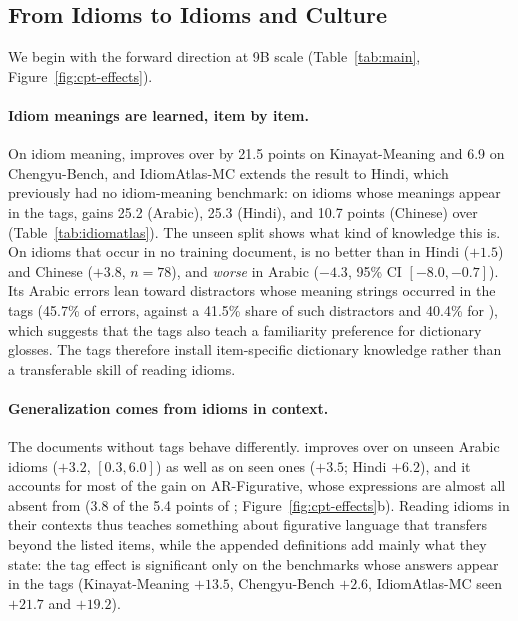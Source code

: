 \subsection{From Idioms to Idioms and Culture}
\label{sec:results-idiom}



We begin with the forward direction at 9B scale (Table~\ref{tab:main}, Figure~\ref{fig:cpt-effects}).

\paragraph{Idiom meanings are learned, item by item.}
On idiom meaning, \idiomcpt{} improves over \random{} by 21.5 points on Kinayat-Meaning and 6.9 on Chengyu-Bench, and IdiomAtlas-MC extends the result to Hindi, which previously had no idiom-meaning benchmark: on idioms whose meanings appear in the tags, \idiomcpt{} gains 25.2 (Arabic), 25.3 (Hindi), and 10.7 points (Chinese) over \random{} (Table~\ref{tab:idiomatlas}). The unseen split shows what kind of knowledge this is. On idioms that occur in no training document, \idiomcpt{} is no better than \random{} in Hindi ($+1.5$) and Chinese ($+3.8$, $n{=}78$), and \emph{worse} in Arabic ($-4.3$, 95\% CI $[-8.0, -0.7]$). Its Arabic errors lean toward distractors whose meaning strings occurred in the tags (45.7\% of errors, against a 41.5\% share of such distractors and 40.4\% for \random{}), which suggests that the tags also teach a familiarity preference for dictionary glosses. The tags therefore install item-specific dictionary knowledge rather than a transferable skill of reading idioms.

\paragraph{Generalization comes from idioms in context.}
The documents without tags behave differently. \idiomdocs{} improves over \random{} on unseen Arabic idioms ($+3.2$, $[0.3, 6.0]$) as well as on seen ones ($+3.5$; Hindi $+6.2$), and it accounts for most of the gain on AR-Figurative, whose expressions are almost all absent from \dataname{} (3.8 of the 5.4 points of \idiomcpt{}; Figure~\ref{fig:cpt-effects}b). Reading idioms in their contexts thus teaches something about figurative language that transfers beyond the listed items, while the appended definitions add mainly what they state: the tag effect is significant only on the benchmarks whose answers appear in the tags (Kinayat-Meaning $+13.5$, Chengyu-Bench $+2.6$, IdiomAtlas-MC seen $+21.7$ and $+19.2$).

